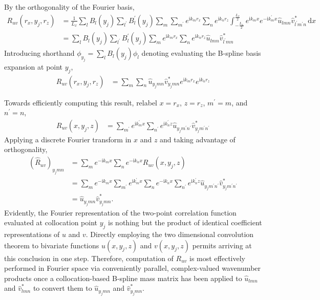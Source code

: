 \documentclass[letterpaper,11pt,nointlimits,reqno]{amsart}
\newcommand{\ii}{\ensuremath{\mathrm{i}}}
\begin{document}
By the orthogonality of the Fourier basis,
\begin{align}
R_{uv} \left( r_x, y_j, r_z \right)
  &= \frac{1}{L_x}
     \sum_{l} B_l\left(y_j\right)
     \sum_{l^\prime} B_l^\prime\left(y_j\right)
     \sum_{m}
     \sum_{m^\prime}
     e^{\ii k_m r_x}
     \sum_{n}
     e^{\ii k_n r_z}
     \int_{-\frac{L_x}{2}}^{\frac{L_x}{2}}
     e^{\ii k_m x  }
     e^{-\ii k_m^\prime x}
     \hat{u}_{l m n}
     \hat{v}^\ast_{l^\prime m^\prime n}
     \,\mathrm{d}x
\\
  &= \sum_{l} B_l\left(y_j\right)
     \sum_{l^\prime} B_l^\prime\left(y_j\right)
     \sum_{m}
     e^{\ii k_m r_x}
     \sum_{n}
     e^{\ii k_n r_z}
     \hat{u}_{l m n}
     \hat{v}^\ast_{l^\prime m n}
\end{align}
Introducing shorthand $\phi_{y_j} = \sum_{l} B_l\left(y_j\right) \phi_l$
denoting evaluating the B-spline basis expansion at point $y_j$,
\begin{align}
R_{uv} \left( r_x, y_j, r_z \right)
  &=
     \sum_{m}
     \sum_{n}
     \hat{u}_{y_j m n}
     \hat{v}^\ast_{y_j m n}
     e^{\ii k_m r_x}
     e^{\ii k_n r_z}
  \label{eq:twopoint_physical_xz}
\end{align}

Towards efficiently computing this result, relabel $x = r_x$, $z = r_z$,
$m^\prime = m$, and $n^\prime = n$,
\begin{align}
R_{uv} \left( x, y_j, z \right)
  &=
     \sum_{m^\prime}
     e^{\ii k_m^\prime x}
     \sum_{n^\prime}
     e^{\ii k_n^\prime z}
     \hat{u}_{y_j m^\prime n^\prime}
     \hat{v}^\ast_{y_j m^\prime n^\prime}
\end{align}
Applying a discrete Fourier transform in $x$ and $z$ and taking advantage of
orthogonality,
\begin{align}
     \left(\hat{R}_{uv}\right)_{y_j m n}
  &=
     \sum_{m}
     e^{-\ii k_m x}
     \sum_{n}
     e^{-\ii k_n x}
     R_{uv} \left( x, y_j, z \right)
\\
  &=
     \sum_{m}
     e^{-\ii k_m x}
     \sum_{m^\prime}
     e^{\ii k_m^\prime x}
     \sum_{n}
     e^{-\ii k_n x}
     \sum_{n^\prime}
     e^{\ii k_n^\prime z}
     \hat{u}_{y_j m^\prime n^\prime}
     \hat{v}^\ast_{y_j m^\prime n^\prime}
\\
  &=
     \hat{u}_{y_j m n}
     \hat{v}^\ast_{y_j m n}
  .
\end{align}
Evidently, the Fourier representation of the two-point correlation function
evaluated at collocation point $y_j$ is nothing but the product of identical
coefficient representations of $u$ and $v$.  Directly employing the two
dimensional convolution theorem to bivariate functions $u(x, y_j, z)$ and $v(x,
y_j, z)$ permits arriving at this conclusion in one step.  Therefore,
computation of $R_{uv}$ is most effectively performed in Fourier space via
conveniently parallel, complex-valued wavenumber products once a
collocation-based B-spline mass matrix has been applied to $\hat{u}_{lmn}$ and
$\hat{v}^\ast_{lmn}$ to convert them to $\hat{u}_{y_j m n}$ and
$\hat{v}^\ast_{y_j m n}$.
\end{document}
